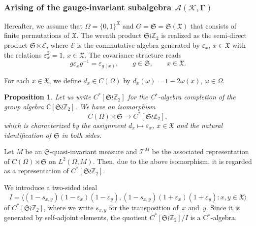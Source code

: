\documentclass[pdftex]{sigma}
\numberwithin{equation}{section}
\newtheorem{Proposition}[Theorem]{Proposition}
 { \theoremstyle{definition}
\newtheorem{Definition}[Theorem]{Definition}
\newtheorem{Example}[Theorem]{Example}
\newtheorem{Remark}[Theorem]{Remark} }
\newcommand{\mfrak}[1]{\mathfrak{#1}}
\newcommand{\mcal}[1]{\mathcal{#1}}
\newcommand{\mbb}[1]{\mathbb{#1}}
\begin{document}
\subsubsection[Arising of the gauge-invariant subalgebra A(K,Gamma)]{Arising of the gauge-invariant subalgebra $\boldsymbol{\mcal{A}(\mcal{K},\Gamma)}$}

Hereafter, we assume that $\Omega=\{0,1\}^{\mfrak{X}}$ and $G=\mfrak{S}=\mfrak{S}(\mfrak{X})$ that consists of finite permutations of $\mfrak{X}$.
The wreath product $\mfrak{S}\wr\mbb{Z}_{2}$ is realized as the semi-direct product $\mfrak{S}\ltimes \mcal{E}$, where $\mcal{E}$ is the commutative algebra generated by $\varepsilon_{x}$, $x\in\mfrak{X}$ with the relations $\varepsilon_{x}^{2}=1$, $x\in\mfrak{X}$. The covariance structure reads
\begin{equation*}
	g\varepsilon_{x}g^{-1}=\varepsilon_{g(x)},\qquad g\in\mfrak{S},\qquad x\in\mfrak{X}.
\end{equation*}

For each $x\in \mfrak{X}$, we define $d_{x}\in C(\Omega)$ by $d_{x}(\omega)=1-2\omega(x)$, $\omega\in\Omega$.
\begin{Proposition}
Let us write $C^{\ast}[\mfrak{S}\wr\mbb{Z}_{2}]$ for the C$^{\ast}$-algebra completion of the group algebra $\mbb{C}[\mfrak{S}\wr\mbb{Z}_{2}]$. We have an isomorphism
\begin{equation*}
	C(\Omega)\rtimes \mfrak{S}\to C^{\ast}[\mfrak{S}\wr\mbb{Z}_{2}],
\end{equation*}
which is characterized by the assignment $d_{x}\mapsto \varepsilon_{x}$, $x\in\mfrak{X}$ and the natural identification of $\mfrak{S}$ in both sides.
\end{Proposition}

Let $M$ be an $\mfrak{S}$-quasi-invariant measure and $\mcal{T}^{M}$ be the associated representation of $C(\Omega)\rtimes\mfrak{S}$ on $L^{2}(\Omega,M)$. Then, due to the above isomorphism, it is regarded as a representation of $C^{\ast}[\mfrak{S}\wr\mbb{Z}_{2}]$.

We introduce a two-sided ideal
\begin{equation*}
	I=\langle (1-s_{x,y})(1-\varepsilon_{x})(1-\varepsilon_{y}), (1-s_{x,y})(1+\varepsilon_{x})(1+\varepsilon_{y})\colon x,y\in \mfrak{X}\rangle
\end{equation*}
of $C^{\ast}[\mfrak{S}\wr\mbb{Z}_{2}]$, where we write $s_{x,y}$ for the transposition of~$x$ and~$y$.
Since it is generated by self-adjoint elements, the quotient $C^{\ast}[\mfrak{S}\wr\mbb{Z}_{2}]/I$ is a C$^{\ast}$-algebra.
\end{document}
